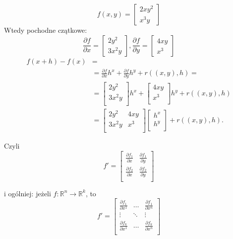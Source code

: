 \documentclass[../main.tex]{subfiles}
\begin{document}
\begin{przyklad}
    \[
        f(x,y) = \left [
        \begin{matrix}
            2xy^2\\
            x^3 y
        \end{matrix}\right ]
    \]
Wtedy pochodne czątkowe:
\[
    \frac{\partial f}{\partial x} =\left [ \begin{matrix} 2y^2\\ 3x^2 y \end{matrix} \right ], \frac{\partial f}{\partial y} = \left [ \begin{matrix} 4xy\\ x^3 \end{matrix}\right ]
\]
\begin{align*}
        f(x+h)-f(x) &= \\
        &= \frac{\partial f}{\partial x} h^x + \frac{\partial f}{\partial y} h^y + r((x,y),h) = \\
        &=\left [ \begin{matrix} 2y^2\\ 3x^2 y\\ \end{matrix}\right ] h^x + \left [ \begin{matrix} 4xy\\ x^3\\ \end{matrix}\right ] h^y + r((x,y),h) \\
        &= \left [ \begin{matrix} 2y^2    &4xy\\ 3x^2 y  &x^3\\ \end{matrix}\right ] \left [ \begin{matrix} h^x\\ h^y\\ \end{matrix}\right ] + r((x,y),h)
.\end{align*}

Czyli
\[
        f' = \left [ \begin{matrix}
\frac{\partial f_1}{\partial x}     &\frac{\partial f_1}{\partial y}\\
\frac{\partial f_2}{\partial x}     &\frac{\partial f_2}{\partial y}\\
\end{matrix}\right ]
\]

i ogólniej: jeżeli $f: \mathbb{R}^n \to \mathbb{R}^k$, to
\[
        f' = \left [ \begin{matrix}
    \frac{\partial f_1}{\partial x^1}   &\dots   &\frac{\partial f_1}{\partial x^n}\\
    \vdots                              &\ddots  &\vdots\\
    \frac{\partial f_k}{\partial x^1}   &\dots   &\frac{\partial f_k}{\partial x^n}\\\end{matrix}\right ]
\]
\end{przyklad}
\end{document}
